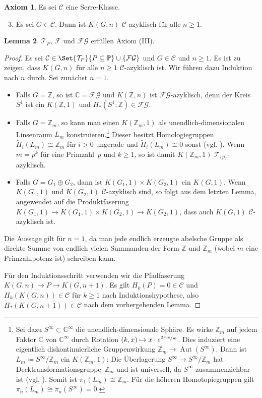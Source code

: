 \documentclass[11pt, a4paper, german]{article}
\theoremstyle{definition}
\newtheorem{lem}{Lemma}
\newtheorem{axiom}[lem]{Axiom}
\theoremstyle{remark}
\newcommand{\Z}{\mathbb{Z}} %
\newcommand{\C}{\mathbb{C}} %
\newcommand{\SC}{\mathcal{C}} %
\newcommand{\FG}{\mathcal{FG}} %
\newcommand{\T}{\mathcal{T}} %
\newcommand{\F}{\mathcal{F}} %
\DeclareMathOperator{\Aut}{Aut} %
\newcommand{\Primes}{\mathbb{P}} %
\begin{document}
\begin{axiom}
  Es sei $\SC$ eine Serre-Klasse.
  \begin{enumerate}[label=(\Roman*)]
    \setcounter{enumi}{2}
    \item Es sei $G \in \SC$.
    Dann ist $K(G, n)$ $\SC$-azyklisch für alle $n \geq 1$.
  \end{enumerate}
\end{axiom}

\begin{lem}\label{homology-kgn-in-c}
  $\T_P$, $\F$ und $\FG$ erfüllen Axiom (III).
\end{lem}

\begin{proof}
  Es sei $\SC \in \Set{\T_P}{P \subseteq \Primes} \cup \{ \FG \}$ und $G \in \SC$ und $n \geq 1$.
  Es ist zu zeigen, dass $K(G, n)$ für alle $n \geq 1$ $\SC$-azyklisch ist.
  Wir führen dazu Induktion nach $n$ durch.
  Sei zunächst $n = 1$.
  \begin{itemize}
    \item Falls $G = \Z$, so ist $\C = \FG$ und $K(\Z, n)$ ist $\FG$-azyklisch, denn der Kreis $S^1$ ist ein $K(\Z, 1)$ und $H_*(S^1; \Z) \in \FG$.
    \item Falls $G = \Z_m$, so kann man einen $K(\Z_m, 1)$ als unendlich-dimensionalen Linsenraum $L_m$ konstruieren.\footnote{Sei dazu $S^\infty \subset \C^\infty$ die unendlich-dimensionale Sphäre. Es wirke $\Z_m$ auf jedem Faktor $\C$ von $\C^\infty$ durch Rotation $(k, x) \mapsto x \cdot e^{\nicefrac{2 \pi i k}{m}}$. Dies induziert eine eigentlich diskontinuierliche Gruppenwirkung $\Z_m \to \Aut(S^\infty)$. Dann ist $L_m \coloneqq S^\infty / \Z_m$ ein $K(\Z_m, 1)$: Die Überlagerung $S^\infty \to S^\infty / \Z_m$ hat Decktransformationsgruppe~$\Z_m$ und ist universell, da $S^\infty$ zusammenziehbar ist (vgl. \cite[\mbox{}1B.3-1B.4]{hatcher:at}). Somit ist $\pi_1(L_m) \cong \Z_m$. Für die höheren Homotopiegruppen gilt $\pi_n(L_m) \cong \pi_n(S^\infty) = 0$.}
    Dieser besitzt Homologiegruppen $\tilde{H}_i(L_m) \cong \Z_m$ für $i > 0$ ungerade und $\tilde{H}_i(L_m) \cong 0$ sonst (vgl. \cite[\mbox{}2.43]{hatcher:at}).
    Wenn $m = p^k$ für eine Primzahl~$p$ und $k \geq 1$, so ist damit $K(\Z_m, 1)$ $\T_{\{ p \}}$-azyklisch.
    \item Falls $G = G_1 \oplus G_2$, dann ist $K(G_1, 1) \times K(G_2, 1)$ ein $K(G, 1)$.
    Wenn $K(G_1, 1)$ und $K(G_2, 1)$ $\SC$-azyklisch sind, so folgt aus dem letzten Lemma, angewendet auf die Produktfaserung $K(G_1, 1) \to K(G_1, 1) \times K(G_2, 1) \to K(G_2, 1)$, dass auch $K(G, 1)$ $\SC$-azyklisch ist.
  \end{itemize}
  Die Aussage gilt für $n=1$, da man jede endlich erzeugte abelsche Gruppe als direkte Summe von endlich vielen Summanden der Form $\Z$ und $\Z_m$ (wobei $m$ eine Primzahlpotenz ist) schreiben kann.

  Für den Induktionsschritt verwenden wir die Pfadfaserung $K(G, n) \to P \to K(G, n{+}1)$.
  Es gilt $H_k(P) = 0 \in \SC$ und $H_k(K(G, n)) \in \SC$ für $k \geq 1$ nach Induktionshypothese, also $\widetilde{H}_*(K(G, n{+}1)) \in \SC$ nach dem vorhergehenden Lemma.
\end{proof}
\end{document}
